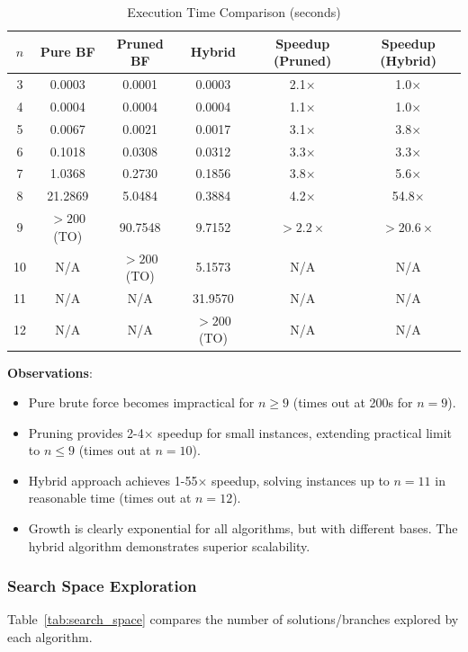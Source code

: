 \documentclass[12pt]{article}
\begin{document}
\begin{table}[h]
\centering
\caption{Execution Time Comparison (seconds)}
\label{tab:execution_times}
\begin{tabular}{c|ccc|cc}
\toprule
$n$ & Pure BF & Pruned BF & Hybrid & Speedup (Pruned) & Speedup (Hybrid) \\
\midrule
3 & 0.0003 & 0.0001 & 0.0003 & 2.1$\times$ & 1.0$\times$ \\
4 & 0.0004 & 0.0004 & 0.0004 & 1.1$\times$ & 1.0$\times$ \\
5 & 0.0067 & 0.0021 & 0.0017 & 3.1$\times$ & 3.8$\times$ \\
6 & 0.1018 & 0.0308 & 0.0312 & 3.3$\times$ & 3.3$\times$ \\
7 & 1.0368 & 0.2730 & 0.1856 & 3.8$\times$ & 5.6$\times$ \\
8 & 21.2869 & 5.0484 & 0.3884 & 4.2$\times$ & 54.8$\times$ \\
9 & $>200$ (TO) & 90.7548 & 9.7152 & $>2.2\times$ & $>20.6\times$ \\
10 & N/A & $>200$ (TO) & 5.1573 & N/A & N/A \\
11 & N/A & N/A & 31.9570 & N/A & N/A \\
12 & N/A & N/A & $>200$ (TO) & N/A & N/A \\
\bottomrule
\end{tabular}
\end{table}

\textbf{Observations}:
\begin{itemize}
    \item Pure brute force becomes impractical for $n \geq 9$ (times out at 200s for $n=9$).
    \item Pruning provides 2-4$\times$ speedup for small instances, extending practical limit to $n \leq 9$ (times out at $n=10$).
    \item Hybrid approach achieves 1-55$\times$ speedup, solving instances up to $n=11$ in reasonable time (times out at $n=12$).
    \item Growth is clearly exponential for all algorithms, but with different bases. The hybrid algorithm demonstrates superior scalability.
\end{itemize}

\subsubsection{Search Space Exploration}

Table~\ref{tab:search_space} compares the number of solutions/branches explored by each algorithm.
\end{document}
